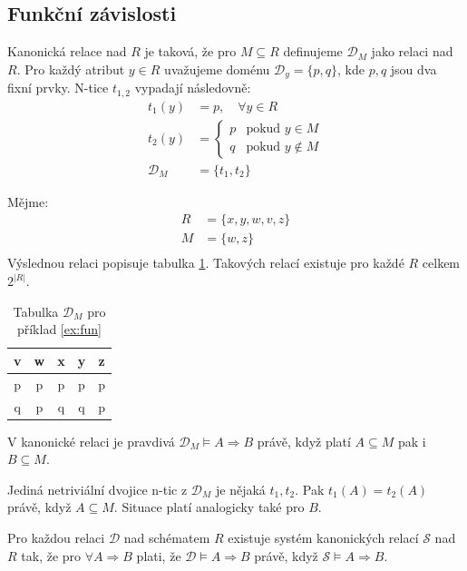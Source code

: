 \subsection{Funkční závislosti}
Kanonická relace nad $R$ je taková, že pro $M \subseteq R$ definujeme $\mathcal{D}_{M}$ jako relaci nad $R$. Pro každý atribut $y \in R$ uvažujeme doménu $\mathcal{D}_{y} = \{ p, q \}$, kde $p, q$ jsou dva fixní prvky. N-tice $t_{1,2}$ vypadají následovně:
\begin{align*}
t_{1}(y) &= p, \quad \forall y \in R \\
t_{2}(y) &=\left\{\!\!\!
\begin{array}{ll}
p & \text{pokud } y \in M \\
q & \text{pokud } y \notin M
\end{array}\right. \\
\mathcal{D}_{M} &= \{ t_{1}, t_{2} \}
\end{align*}
\begin{upexample}\label{ex:fun}
Mějme:
\begin{align*}
R &= \{ x, y, w, v, z \} \\
M &= \{ w, z \} \\
\end{align*}
Výslednou relaci popisuje tabulka \ref{tab:relfun}. Takových relací existuje pro každé $R$ celkem $2^{|R|}$.
\end{upexample}
\begin{table}
\centering
\caption{Tabulka $\mathcal{D}_{M}$ pro příklad \ref{ex:fun}}\label{tab:relfun}
\begin{tabular}{c c c c c}
v & w & x & y & z \\
\hline
p & p & p & p & p \\
q & p & q & q & p
\end{tabular}
\end{table}
\begin{upquote}
V kanonické relaci je pravdivá $\mathcal{D}_{M} \vDash A \Rightarrow B$ právě, když platí $A \subseteq M$ pak i $B \subseteq M$.
\end{upquote}
\begin{upproof}
Jediná netriviální dvojice n-tic z $\mathcal{D}_{M}$ je nějaká $t_{1}, t_{2}$. Pak $t_{1}(A) = t_{2}(A)$ právě, když $A \subseteq M$. Situace platí analogicky také pro $B$.
\end{upproof}
\begin{upquote}
Pro každou relaci $\mathcal{D}$ nad schématem $R$ existuje systém kanonických relací $\mathcal{S}$ nad $R$ tak, že pro $\forall A \Rightarrow B$ plati, že $\mathcal{D} \vDash A \Rightarrow B$ právě, když $\mathcal{S} \vDash A \Rightarrow B$.
\end{upquote}
